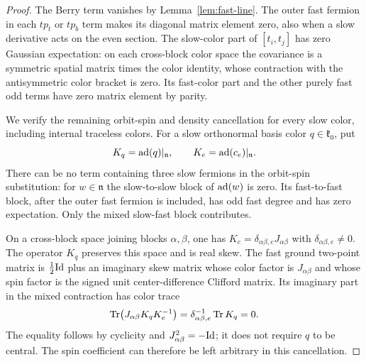 \begin{proof}
The Berry term vanishes by Lemma~\ref{lem:fast-line}. The outer fast
fermion in each $tp_t$ or $tp_b$ term makes its diagonal matrix
element zero, also when a slow derivative acts on the even section.
The slow-color part of $[t_i,t_j]$ has zero Gaussian expectation:
on each cross-block color space the covariance is a symmetric
spatial matrix times the color identity, whose contraction with the
antisymmetric color bracket is zero. Its fast-color part and the
other purely fast odd terms have zero matrix element by parity.

We verify the remaining orbit-spin and density cancellation for
every slow color, including internal traceless colors. For a slow
orthonormal basis color $q\in\mathfrak k_0$, put
\[
 K_q=\operatorname{ad}(q)|_{\mathfrak n},\qquad K_e=\operatorname{ad}(c_e)|_{\mathfrak n}.
\]
There can be no term containing three slow fermions in the
orbit-spin substitution: for $w\in\mathfrak n$ the slow-to-slow
block of $\operatorname{ad}(w)$ is zero. Its fast-to-fast block, after the outer
fast fermion is included, has odd fast degree and has zero
expectation. Only the mixed slow-fast block contributes.

On a cross-block space joining blocks $\alpha,\beta$, one has
$K_e=\delta_{\alpha\beta,e}J_{\alpha\beta}$ with
$\delta_{\alpha\beta,e}\ne0$. The operator $K_q$ preserves this
space and is real skew. The fast ground two-point matrix is
$\frac12\mathrm{Id}$ plus an imaginary skew matrix whose color factor is
$J_{\alpha\beta}$ and whose spin factor is the signed unit
center-difference Clifford matrix. Its imaginary part in the mixed
contraction has color trace
\begin{equation}
 \operatorname{Tr}\bigl(J_{\alpha\beta}K_qK_e^{-1}\bigr)
 =\delta_{\alpha\beta,e}^{-1}\operatorname{Tr} K_q=0.
 \label{fast:imaginary-cancellation}
\end{equation}
The equality follows by cyclicity and $J_{\alpha\beta}^2=-\mathrm{Id}$;
it does not require $q$ to be central. The spin coefficient can
therefore be left arbitrary in this cancellation.


\end{proof}
